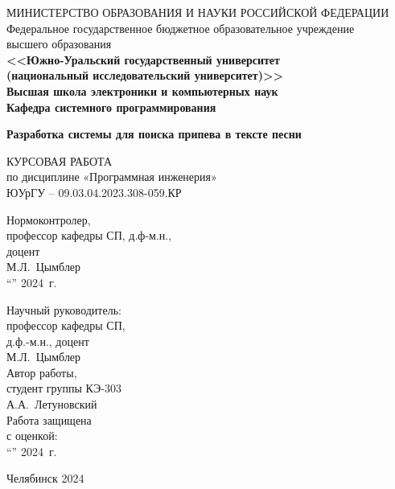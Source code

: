 \newpage
\thispagestyle{empty}
\begin{adjustwidth}[]{0cm}{0cm}
\begin{center}
\begin{linespread}{1}


\small{
МИНИСТЕРСТВО ОБРАЗОВАНИЯ И НАУКИ РОССИЙСКОЙ ФЕДЕРАЦИИ\\
Федеральное государственное бюджетное образовательное учреждение\\
высшего образования\\
\textbf{<<Южно-Уральский государственный университет\\
(национальный исследовательский университет)>>\\
Высшая школа электроники и компьютерных наук\\
Кафедра системного программирования}
}



{
\large\textbf{Разработка системы для поиска припева в тексте песни}
}

\vspace{2em}

КУРСОВАЯ РАБОТА \\
по дисциплине «Программная инженерия»\\
ЮУрГУ – 09.03.04.2023.308-059.КР




\parbox[t]{7cm}{
Нормоконтролер,\\
профессор кафедры СП, д.ф-м.н., \\  
доцент\\[0.5em]
\underline{\hspace{2.5cm}} М.Л.~Цымблер \\[0.5em]
``\underline{\qquad}''\underline{\hspace{2.5cm}} 2024~г.
}
\hfill{}
\parbox[t]{7cm}{
Научный руководитель: \\
профессор кафедры СП, \\
д.ф.-м.н., доцент\\[0.5em]
\underfield{} М.Л.~Цымблер \\[2.5em]
Автор работы, \\
студент группы КЭ-303\\[0.5em]
\underfield{} А.А.~Летуновский \\[2.5em]
Работа защищена \\
с оценкой: \underfield{} \\[0.5em]
``\underline{\qquad}''\underfield{} 2024~г.
}


Челябинск 2024

\end{linespread}
\end{center}
\end{adjustwidth}

\pagebreak
